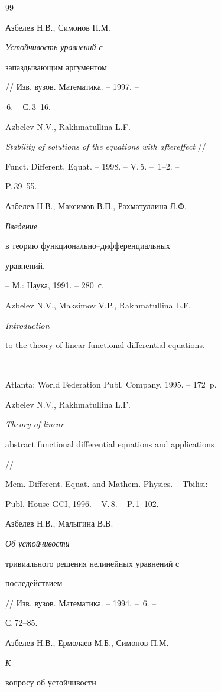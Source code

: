 \begin{thebibliography}{99}







Азбелев Н.В., Симонов П.М. {\em Устойчивость уравнений с


запаздывающим аргументом} // Изв. вузов. Математика. -- 1997. --


\No\,6. -- С.\,3--16.




Azbelev N.V., Rakhmatullina L.F.


{\em Stability of solutions of the equations with aftereffect} //


Funct. Different. Equat. -- 1998. -- V.\,5. -- \No\,1--2. --


P.\,39--55.




Азбелев Н.В., Максимов В.П., Рахматуллина Л.Ф. {\em Введение


в теорию функционально--дифференциальных


уравнений.} -- М.: Наука, 1991. -- 280~с.




Azbelev N.V., Maksimov V.P., Rakhmatullina L.F. {\em Introduction


to the theory of linear functional differential equations.} --


Atlanta: World Federation Publ. Company, 1995. -- 172~p.




Azbelev N.V., Rakhmatullina L.F. {\em Theory of linear


abstract functional differential equations and applications} //


Mem. Different. Equat. and Mathem. Physics. -- Tbilisi:


Publ. House GCI, 1996. -- V.\,8. -- P.\,1--102.




Азбелев Н.В., Малыгина В.В. {\em Об устойчивости


тривиального решения нелинейных уравнений с


последействием} // Изв. вузов. Математика. -- 1994. -- \No\,6. --


С.\,72--85.




Азбелев Н.В., Ермолаев М.Б., Симонов П.М. {\em К


вопросу об устойчивости


}
\end{thebibliography}
